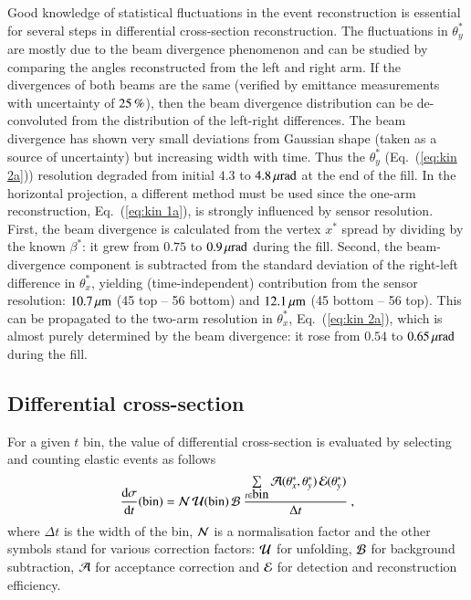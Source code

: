 Good knowledge of statistical fluctuations in the event reconstruction is essential for several steps in differential cross-section reconstruction. The fluctuations in $\theta_y^*$ are mostly due to the beam divergence phenomenon and can be studied by comparing the angles reconstructed from the left and right arm. If the divergences of both beams are the same (verified by emittance measurements with uncertainty of $25\,{\rm \%}$), then the beam divergence distribution can be de-convoluted from the distribution of the left-right differences. The beam divergence has shown very small deviations from Gaussian shape (taken as a source of uncertainty) but increasing width with time. Thus the $\theta_y^*$ (Eq.~(\ref{eq:kin 2a})) resolution degraded from initial $4.3$ to $4.8\,{\rm \mu rad}$ at the end of the fill. In the horizontal projection, a different method must be used since the one-arm reconstruction, Eq.~(\ref{eq:kin 1a}), is strongly influenced by sensor resolution. First, the beam divergence is calculated from the vertex $x^*$ spread by dividing by the known $\beta^*$: it grew from $0.75$ to $0.9\,{\rm \mu rad}$ during the fill. Second, the beam-divergence component is subtracted from the standard deviation of the right-left difference in $\theta_x^*$, yielding (time-independent) contribution from the sensor resolution: $10.7\,{\rm \mu m}$ (45 top -- 56 bottom) and $12.1\,{\rm \mu m}$ (45 bottom -- 56 top). This can be propagated to the two-arm resolution in $\theta_x^*$, Eq.~({\ref{eq:kin 2a}}), which is almost purely determined by the beam divergence: it rose from $0.54$ to $0.65\,{\rm \mu rad}$ during the fill. 


\subsection{Differential cross-section}

For a given $t$ bin, the value of differential cross-section is evaluated by selecting and counting elastic events as follows
\begin{equation}
{\d\sigma\over \d t}(\hbox{bin}) =
	{\cal N}\, {\cal U}({\rm bin})\, {\cal B}\ 
	{\sum\limits_{t \in \hbox{bin}} {\cal A}(\theta_x^*, \theta_y^*)\, {\cal E}(\theta_y^*)\over \Delta t}\ ,
\end{equation}
where $\Delta t$ is the width of the bin, ${\cal N}$ is a normalisation factor and the other symbols stand for various correction factors:
 ${\cal U}$ for unfolding, ${\cal B}$ for background subtraction, ${\cal A}$ for acceptance correction and ${\cal E}$ for detection and reconstruction efficiency.


